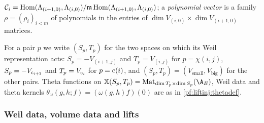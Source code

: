 \begin{definition}
$\mathcal C_i=\mathrm{Hom}(\Lambda_{(i+1,0)},\Lambda_{(i,0)})/\mathfrak m\,\mathrm{Hom}(\Lambda_{(i+1,0)},\Lambda_{(i,0)})$; a \emph{polynomial vector} is a family $\rho=(\rho_i)_{i<m}$ of
polynomials in the entries of $\dim V_{(i,0)}\times\dim V_{(i+1,0)}$ matrices.
\end{definition}

For a pair $p$ we write $(S_p,T_p)$ for the two spaces on which its Weil representation acts: $S_p=-V_{(i+1,j)}$ and
$T_p=V_{(i,j)}$ for $p=\chi(i,j)$, $S_p=-V_{\mathrm{c}_{i+1}}$ and $T_p=V_{\mathrm{c}_i}$ for $p=\mathrm{c}(i)$, and $(S_p,T_p)=(V_{\text{small}},
V_{\text{big}})$ for the other pairs. Theta functions on $\fsX(S_p,T_p)=\mathrm{Mat}_{\dim T_p\times\dim S_p}(\A_E)$, Weil data
and theta kernels $\theta_\omega(g,h;f)=(\omega(g,h)f)(0)$ are as in \cref{pf:liftinj:thetadef}.

\subsubsection{Weil data, volume data and lifts}

